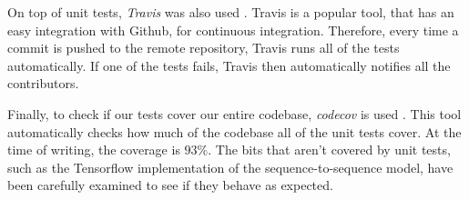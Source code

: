 On top of unit tests, \textit{Travis} was also used \cite{travis}.
Travis is a popular tool, that has an easy integration with Github, for continuous integration.
Therefore, every time a commit is pushed to the remote repository, Travis runs all of the tests automatically.
If one of the tests fails, Travis then automatically notifies all the contributors.

Finally, to check if our tests cover our entire codebase, \textit{codecov} is used \cite{codecov}.
This tool automatically checks how much of the codebase all of the unit tests cover.
At the time of writing, the coverage is $93\%$.
The bits that aren't covered by unit tests, such as the Tensorflow implementation of the sequence-to-sequence model, have been carefully examined to see if they behave as expected.

